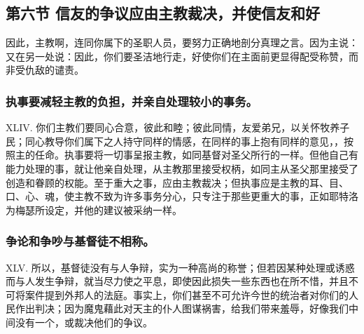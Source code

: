 
\subsection{第六节 信友的争议应由主教裁决，并使信友和好}

因此，主教啊，连同你属下的圣职人员，要努力正确地剖分真理之言。因为主说： 又在另一处说：因此，你们要圣洁地行走，好使你们在主面前更显得配受称赞，而非受仇敌的谴责。\par


\subsubsection{执事要减轻主教的负担，并亲自处理较小的事务。}

XLIV. 你们主教们要同心合意，彼此和睦；彼此同情，友爱弟兄，以关怀牧养子民；同心教导你们属下之人持守同样的情感，在同样的事上抱有同样的意见，，按照主的任命。执事要将一切事呈报主教，如同基督对圣父所行的一样。但他自己有能力处理的事，就让他亲自处理，从主教那里接受权柄，如同主从圣父那里接受了创造和眷顾的权能。至于重大之事，应由主教裁决；但执事应是主教的耳、目、口、心、魂，使主教不致为许多事务分心，只专注于那些更重大的事，正如耶特洛为梅瑟所设定，并他的建议被采纳一样。\par


\subsubsection{争论和争吵与基督徒不相称。}

XLV. 所以，基督徒没有与人争辩，实为一种高尚的称誉；但若因某种处理或诱惑而与人发生争辩，就当尽力使之平息，即使因此损失一些东西也在所不惜，并且不可将案件提到外邦人的法庭。事实上，你们甚至不可允许今世的统治者对你们的人民作出判决；因为魔鬼藉此对天主的仆人图谋祸害，给我们带来羞辱，好像我们中间没有一个，或裁决他们的争议。\par

